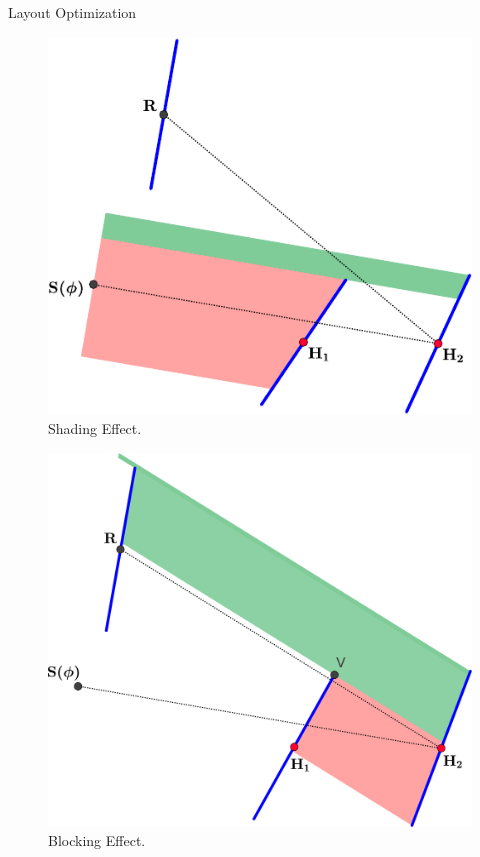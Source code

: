 \documentclass[10pt, xcolor={dvipsnames}]{beamer}
\begin{document}
\begin{frame}{Layout Optimization}
\begin{minipage}[t]{0.5\textwidth}
\begin{center}
\begin{figure}
\includegraphics[width=.9\textwidth]{../figures/shading-crop.pdf}
\caption{Shading Effect.}
\end{figure}
\end{center}
\end{minipage}%
\begin{minipage}[t]{0.5\textwidth}
\begin{center}
\begin{figure}
\includegraphics[width=.95\textwidth]{../figures/blocking-crop.pdf}
\caption{Blocking Effect.}
\end{figure}
\end{center}
\end{minipage}
\end{frame}
\end{document}
